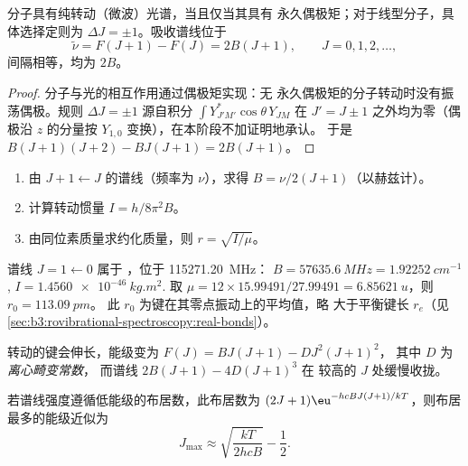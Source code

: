 \begin{proposition}[纯转动光谱]\label{prop:b3:rovibrational-spectroscopy:rotational-lines}
分子具有纯转动（微波）光谱，当且仅当其具有
永久偶极矩；对于线型分子，具体选择定则为 $\Delta J
= \pm1$。吸收谱线位于
\[
\tilde\nu = F(J+1) - F(J) = 2B(J + 1), \qquad J = 0, 1, 2, \dots,
\]
间隔相等，均为 $2B$。
\end{proposition}

\begin{proof}
分子与光的相互作用通过偶极矩实现：无
永久偶极矩的分子转动时没有振荡偶极。规则 $\Delta J
= \pm1$ 源自积分 $\int Y_{J'M'}^*\cos\theta\,Y_{JM}$ 在 $J' = J
\pm 1$ 之外均为零（偶极沿 $z$ 的分量按 $Y_{1,0}$ 变换），在本阶段不加证明地承认。
于是 $B(J+1)(J+2) - BJ(J+1) = 2B(J+1)$。
\end{proof}

\begin{method}[由转动谱线求键长]\label{met:b3:rovibrational-spectroscopy:bond-length}
\begin{enumerate}
  \item 由 $J + 1 \leftarrow J$ 的谱线（频率为 $\nu$），求得 $B =
        \nu/2(J+1)$（以赫兹计）。
  \item 计算转动惯量 $I = h/8\pi^2B$。
  \item 由同位素质量求约化质量，则 $r = \sqrt{I/\mu}$。
\end{enumerate}
\end{method}

\begin{example}[一氧化碳]\label{ex:b3:rovibrational-spectroscopy:co}
谱线 $J = 1 \leftarrow 0$ 属于 ，位于 \qty{115271.20}{MHz}：
$B = \qty{57635.6}{MHz} = \qty{1.92252}{cm^{-1}}$, $I = \qty{1.4560e-46}{kg.m^2}$.
取 $\mu = 12 \times 15.99491/27.99491 = \qty{6.85621}{u}$，则 $r_0 = \qty{113.09}{pm}$。
此 $r_0$ 为键在其零点振动上的平均值，略
大于平衡键长 $r_e$（见\cref{sec:b3:rovibrational-spectroscopy:real-bonds}）。
\end{example}

\begin{definition}[离心畸变常数]\label{def:b3:rovibrational-spectroscopy:centrifugal}
转动的键会伸长，能级变为 $F(J) = BJ(J+1) - DJ^2(J+1)^2$，
其中 $D$ 为\emph{离心畸变常数}，
而谱线 $2B(J+1) - 4D(J+1)^3$ 在
较高的 $J$ 处缓慢收拢。
\end{definition}

\begin{proposition}[最强谱线]\label{prop:b3:rovibrational-spectroscopy:jmax}
若谱线强度遵循低能级的布居数，此布居数为 $(2J+1)
\eu^{-hcBJ(J+1)/kT}$，则布居最多的能级近似为
\[
J_{\max} \approx \sqrt{\frac{kT}{2hcB}} - \frac12.
\]
\end{proposition}

